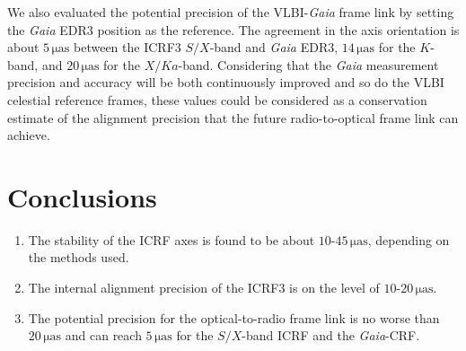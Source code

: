 \documentclass{aa}
\begin{document}
    We also evaluated the potential precision of the VLBI-\textit{Gaia} frame link by setting the \textit{Gaia} EDR3 position as the reference.
    The agreement in the axis orientation is about $\mathrm{5\,\mu as}$ between the ICRF3 $S/X$-band and \textit{Gaia} EDR3, $\mathrm{14\,\mu as}$ for the $K$-band, and $\mathrm{20\,\mu as}$ for the $X/Ka$-band.
    Considering that the \textit{Gaia} measurement precision and accuracy will be both continuously improved and so do the VLBI celestial reference frames,
    these values could be considered as a conservation estimate of the alignment precision that the future radio-to-optical frame link can achieve.

%
%

\section{Conclusions}

   \begin{enumerate}
      \item The stability of the ICRF axes is found to be about $\mathrm{10}$-$\mathrm{45\,\mu as}$, depending on the methods used.
      \item The internal alignment precision of the ICRF3 is on the level of $\mathrm{10}$-$\mathrm{20\,\mu as}$.
      \item The potential precision for the optical-to-radio frame link is no worse than $\mathrm{20\,\mu as}$ and can reach $\mathrm{5\,\mu as}$ for the $S/X$-band ICRF and the \textit{Gaia}-CRF.
   \end{enumerate}

\begin{acknowledgements}
      
\end{acknowledgements}

\end{document}
